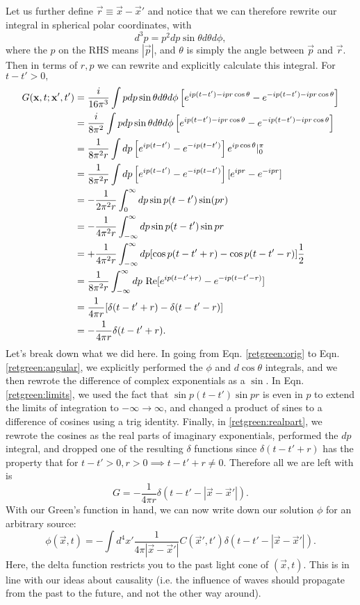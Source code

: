 Let us further define $\vec r\equiv \vec x-\vec x'$ and notice that we can therefore rewrite our integral in spherical polar coordinates, with
$$d^3p=p^2 dp \sin \theta d\theta d\phi,$$
where the $p$ on the RHS means $|\vec p|$, and $\theta$ is simply the angle between $\vec p$ and $\vec r$. Then in terms of $r,p$ we can rewrite and explicitly calculate this integral. For $t-t'>0,$
\begin{align}
    G(\boldsymbol{\mathbf{x}},t;\boldsymbol{\mathbf{x}}',t')&=\frac{i}{16\pi^3}\int pdp \sin\theta d\theta d\phi \left[e^{ip(t-t')-ipr\cos\theta}-e^{-ip(t-t')-ipr\cos\theta}\right]\label{retgreen:orig}\\
    &=\frac{i}{8\pi^2}\int pdp \sin\theta d\theta d\phi \left[e^{ip(t-t')-ipr\cos\theta}-e^{-ip(t-t')-ipr\cos\theta}\right]\nonumber\\
    &=\frac{1}{8\pi^2 r}\int dp \left[e^{ip(t-t')}-e^{-ip(t-t')}\right]e^{ip\cos\theta}|_0^\pi\nonumber\\
    &=\frac{1}{8\pi^2 r}\int dp \left[e^{ip(t-t')}-e^{-ip(t-t')}\right][e^{ipr}-e^{-ipr}]\label{retgreen:angular}\\
    &=-\frac{1}{2\pi^2 r}\int_0^\infty dp \sin p(t-t') \sin(pr)\nonumber\\
    &=-\frac{1}{4\pi^2r}\int_{-\infty}^\infty dp \sin p(t-t')\sin pr\label{retgreen:limits}\\
    &=+\frac{1}{4\pi^2 r}\int_{-\infty}^\infty dp [\cos p(t-t'+r)-\cos p(t-t'-r)] \frac{1}{2}\nonumber\\
    &=\frac{1}{8\pi^2 r}\int_{-\infty}^\infty dp \text{ Re}[e^{ip(t-t'+r)}-e^{-ip(t-t'-r)}]\label{retgreen:realpart}\\
    &= \frac{1}{4\pi r} [\delta(t-t'+r)-\delta(t-t'-r)]\nonumber\\
    &= -\frac{1}{4\pi r} \delta(t-t'+r).\nonumber
\end{align}
Let's break down what we did here. In going from Eqn. \ref{retgreen:orig} to Eqn. \ref{retgreen:angular}, we explicitly performed the $\phi$ and $d\cos\theta$ integrals, and we then rewrote the difference of complex exponentials as a $\sin$. In Eqn. \ref{retgreen:limits}, we used the fact that $\sin p(t-t') \sin pr$ is even in $p$ to extend the limits of integration to $-\infty\to\infty$, and changed a product of sines to a difference of cosines using a trig identity. Finally, in \ref{retgreen:realpart}, we rewrote the cosines as the real parts of imaginary exponentials, performed the $dp$ integral, and dropped one of the resulting $\delta$ functions since $\delta(t-t'+r)$ has the property that for $t-t'>0,r>0 \implies t-t'+r\neq 0$. Therefore all we are left with is
$$G=-\frac{1}{4\pi r}\delta(t-t'-|\vec x-\vec x'|).$$
With our Green's function in hand, we can now write down our solution $\phi$ for an arbitrary source:
$$\phi(\vec x,t)=-\int d^4x'\frac{1}{4\pi|\vec x-\vec x'|} C(\vec x',t')\delta (t-t'-|\vec x-\vec x'|).$$
Here, the delta function restricts you to the past light cone of $(\vec x,t)$. This is in line with our ideas about causality (i.e. the influence of waves should propagate from the past to the future, and not the other way around).


